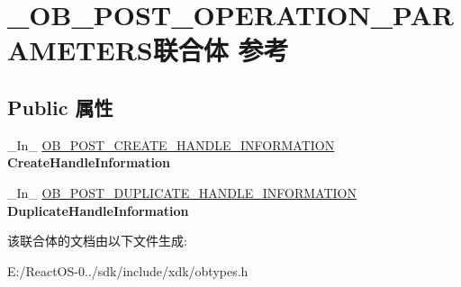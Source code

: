 \hypertarget{union___o_b___p_o_s_t___o_p_e_r_a_t_i_o_n___p_a_r_a_m_e_t_e_r_s}{}\section{\+\_\+\+O\+B\+\_\+\+P\+O\+S\+T\+\_\+\+O\+P\+E\+R\+A\+T\+I\+O\+N\+\_\+\+P\+A\+R\+A\+M\+E\+T\+E\+R\+S联合体 参考}
\label{union___o_b___p_o_s_t___o_p_e_r_a_t_i_o_n___p_a_r_a_m_e_t_e_r_s}
\subsection*{Public 属性}
\begin{DoxyCompactItemize}
\item 
\mbox{\label{union___o_b___p_o_s_t___o_p_e_r_a_t_i_o_n___p_a_r_a_m_e_t_e_r_s_af0c911aff35b8007a1d4b845ce69268d}} 
\+\_\+\+In\+\_\+ \hyperlink{struct___o_b___p_o_s_t___c_r_e_a_t_e___h_a_n_d_l_e___i_n_f_o_r_m_a_t_i_o_n}{O\+B\+\_\+\+P\+O\+S\+T\+\_\+\+C\+R\+E\+A\+T\+E\+\_\+\+H\+A\+N\+D\+L\+E\+\_\+\+I\+N\+F\+O\+R\+M\+A\+T\+I\+ON} {\bfseries Create\+Handle\+Information}
\item 
\mbox{\label{union___o_b___p_o_s_t___o_p_e_r_a_t_i_o_n___p_a_r_a_m_e_t_e_r_s_aaf9d73374e947410ae39e62ebd144de2}} 
\+\_\+\+In\+\_\+ \hyperlink{struct___o_b___p_o_s_t___d_u_p_l_i_c_a_t_e___h_a_n_d_l_e___i_n_f_o_r_m_a_t_i_o_n}{O\+B\+\_\+\+P\+O\+S\+T\+\_\+\+D\+U\+P\+L\+I\+C\+A\+T\+E\+\_\+\+H\+A\+N\+D\+L\+E\+\_\+\+I\+N\+F\+O\+R\+M\+A\+T\+I\+ON} {\bfseries Duplicate\+Handle\+Information}
\end{DoxyCompactItemize}


该联合体的文档由以下文件生成\+:\begin{DoxyCompactItemize}
\item 
E\+:/\+React\+O\+S-\/0../sdk/include/xdk/obtypes.\+h\end{DoxyCompactItemize}
